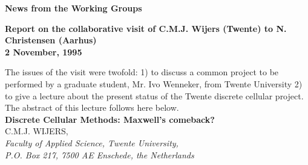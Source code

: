{%

\newpage
\vspace{2cm}
\begin{center}
\LARGE {\bf News from the Working Groups \par}
\end{center}
\vspace{0.5cm}
\normalsize
\begin{center}
\Large{\bf Report on the collaborative visit of C.M.J. Wijers (Twente)
to N. Christensen (Aarhus)}\\
\large{\bf 2 November, 1995}\\
\end{center}
\vspace{0.5cm}

\noindent
The issues of the visit were twofold: 1) to discuss a common project to be 
performed by a graduate student, Mr. Ivo Wenneker, from Twente University 
2) to give a lecture about the present status of the Twente discrete cellular 
project. The abstract of this lecture follows here below.\\

\bigskip
\noindent
{\large{\bf Discrete Cellular Methods: Maxwell's comeback?}}\\

\noindent
C.M.J. WIJERS,\\
{\it Faculty of Applied Science, Twente University,}\\
{\it P.O. Box 217, 7500 AE Enschede, the Netherlands}\\

}
